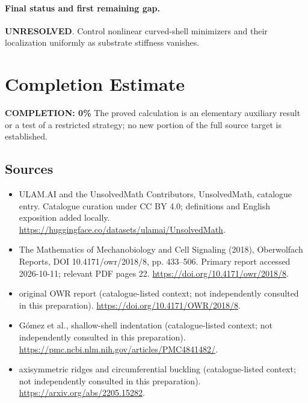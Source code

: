 \documentclass[11pt]{article}
\begin{document}
\paragraph{Final status and first remaining gap.}
\textbf{UNRESOLVED}. Control nonlinear curved-shell minimizers and their localization uniformly as substrate stiffness vanishes.

\section{Completion Estimate}
\noindent\textbf{COMPLETION: 0\%}
The proved calculation is an elementary auxiliary result or a test of a restricted strategy; no new portion of the full source target is established.

\subsection{Sources}
\begin{itemize}
\item[\hypertarget{source:statement:1}{S1}] ULAM.AI and the UnsolvedMath Contributors, UnsolvedMath, catalogue entry. Catalogue curation under CC BY 4.0; definitions and English exposition added locally.
\url{https://huggingface.co/datasets/ulamai/UnsolvedMath}.
\item[\hypertarget{source:statement:2}{S2}] The Mathematics of Mechanobiology and Cell Signaling (2018), Oberwolfach Reports, DOI 10.4171/owr/2018/8, pp. 433--506. Primary report accessed 2026-10-11; relevant PDF pages 22.
\url{https://doi.org/10.4171/owr/2018/8}.
\item[\hypertarget{source:statement:3}{S3}] original OWR report (catalogue-listed context; not independently consulted in this preparation).
\url{https://doi.org/10.4171/OWR/2018/8}.
\item[\hypertarget{source:statement:4}{S4}] Gómez et al., shallow-shell indentation (catalogue-listed context; not independently consulted in this preparation).
\url{https://pmc.ncbi.nlm.nih.gov/articles/PMC4841482/}.
\item[\hypertarget{source:statement:5}{S5}] axisymmetric ridges and circumferential buckling (catalogue-listed context; not independently consulted in this preparation).
\url{https://arxiv.org/abs/2205.15282}.
\end{itemize}
\label{end:statement}
\end{document}
